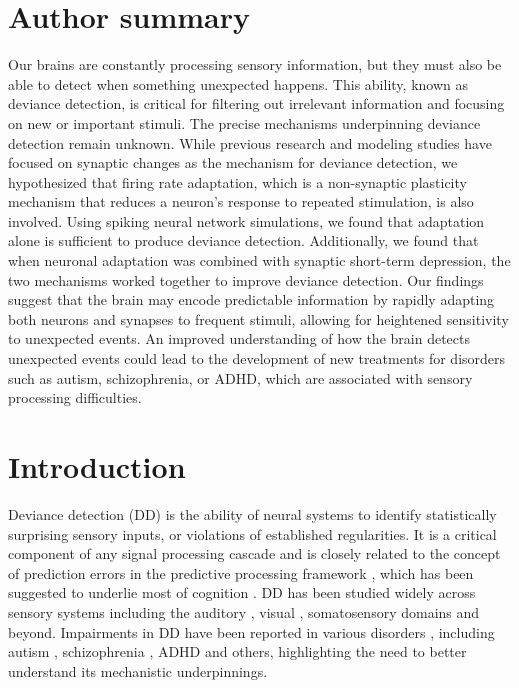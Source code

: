 \documentclass[10pt,letterpaper]{article}
\begin{document}
\section*{Author summary}
Our brains are constantly processing sensory information, but they must also be able to detect when something unexpected happens. This ability, known as deviance detection, is critical for filtering out irrelevant information and focusing on new or important stimuli. The precise mechanisms underpinning deviance detection remain unknown. While previous research and modeling studies have focused on synaptic changes as the mechanism for deviance detection, we hypothesized that firing rate adaptation, which is a non-synaptic plasticity mechanism that reduces a neuron's response to repeated stimulation, is also involved. Using spiking neural network simulations, we found that adaptation alone is sufficient to produce deviance detection. Additionally, we found that when neuronal adaptation was combined with synaptic short-term depression, the two mechanisms worked together to improve deviance detection. Our findings suggest that the brain may encode predictable information by rapidly adapting both neurons and synapses to frequent stimuli, allowing for heightened sensitivity to unexpected events. An improved understanding of how the brain detects unexpected events could lead to the development of new treatments for disorders such as autism, schizophrenia, or ADHD, which are associated with sensory processing difficulties.

\linenumbers

\section*{Introduction}
Deviance detection (DD) is the ability of neural systems to identify statistically surprising sensory inputs, or violations of established regularities. It is a critical component of any signal processing cascade and is closely related to the concept of prediction errors in the predictive processing framework \cite{Bendixen2012-nx, Khouri2015-gr, Carbajal2018-sd, Fong2020-em}, which has been suggested to underlie most of cognition \cite{Friston2005-jz, Clark2015-gl}. DD has been studied widely across sensory systems including the auditory \cite{Nelken2014-wr, Escera2014-tv, Carbajal2018-sd}, visual \cite{Winkler2012-pr, Pazo-Alvarez2003-kv}, somatosensory \cite{Naatanen2009-jx} domains and beyond. Impairments in DD have been reported in various disorders \cite{Fong2020-em}, including autism \cite{Schwartz2018-bc, Goris2018-bv, Hudac2018-jl, Vlaskamp2017-vs, Chen2020-lu}, schizophrenia \cite{Koshiyama2020-ca, Kim2020-fb, Salisbury2020-sd, Tada2019-lj}, ADHD \cite{Kim2021-uj, Hsieh2021-ti, Lee2020-np} and others, highlighting the need to better understand its mechanistic underpinnings.
\end{document}

